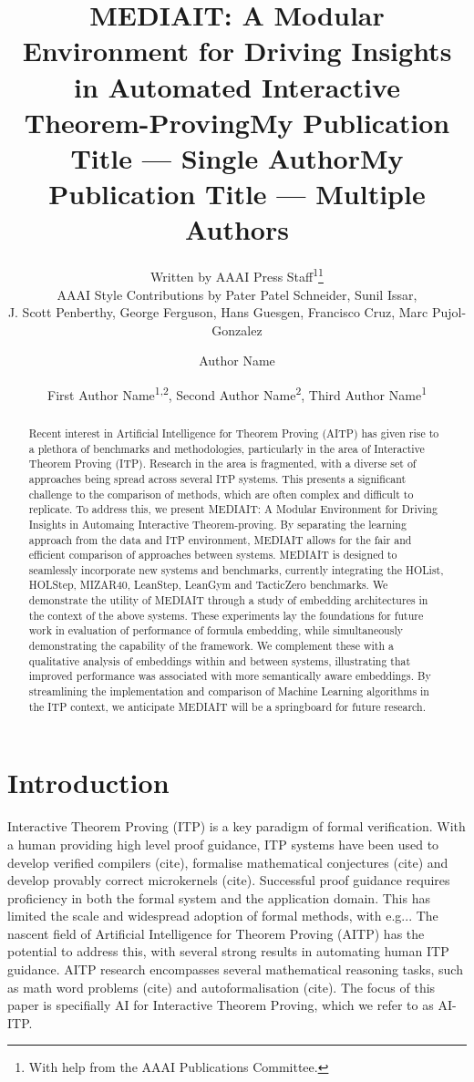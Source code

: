 \documentclass[letterpaper]{article} %
\title{MEDIAIT: A Modular Environment for Driving Insights in Automated Interactive Theorem-Proving}
\author{
    Written by AAAI Press Staff\textsuperscript{\rm 1}\thanks{With help from the AAAI Publications Committee.}\\
    AAAI Style Contributions by Pater Patel Schneider,
    Sunil Issar,\\
    J. Scott Penberthy,
    George Ferguson,
    Hans Guesgen,
    Francisco Cruz\equalcontrib,
    Marc Pujol-Gonzalez\equalcontrib
}
\title{My Publication Title --- Single Author}
\author {
    Author Name
}
\title{My Publication Title --- Multiple Authors}
\author {
    First Author Name\textsuperscript{\rm 1,\rm 2},
    Second Author Name\textsuperscript{\rm 2},
    Third Author Name\textsuperscript{\rm 1}
}
\begin{document}
\maketitle

\begin{abstract}
    Recent interest in Artificial Intelligence for Theorem Proving (AITP) has given rise to a plethora of benchmarks and
    methodologies,
    particularly in the area of Interactive Theorem Proving (ITP).
    Research in the area is fragmented, with a diverse set of approaches being spread across several ITP systems.
    This presents a significant challenge to the comparison of methods, which are often complex and difficult to replicate.
    To address this, we present MEDIAIT: A Modular Environment for Driving Insights in Automaing Interactive Theorem-proving.
    By separating the learning approach from the data and ITP environment, MEDIAIT allows for the fair and efficient
    comparison of approaches between systems.
    MEDIAIT is designed to seamlessly incorporate new systems and benchmarks, currently integrating the HOList, HOLStep,
    MIZAR40, LeanStep, LeanGym and TacticZero benchmarks.
    We demonstrate the utility of MEDIAIT through a study of embedding architectures in the context of the above systems.
    These experiments lay the foundations for future work in evaluation of performance of formula embedding,
    while simultaneously demonstrating the capability of the framework.
    We complement these with a qualitative analysis of embeddings within and between systems, illustrating that improved
    performance was associated with more semantically aware embeddings.
    By streamlining the implementation and comparison of Machine Learning algorithms in the ITP context,
    we anticipate MEDIAIT will be a springboard for future
    research.

\end{abstract}

\section{Introduction}

Interactive Theorem Proving (ITP) is a key paradigm of formal verification.
With a human providing high level proof guidance, ITP systems have been used to develop verified compilers (cite), formalise mathematical conjectures (cite) and develop provably correct microkernels (cite).
Successful proof guidance requires proficiency in both the formal system and the application domain.
This has limited the scale and widespread adoption of formal methods, with e.g...
The nascent field of Artificial Intelligence for Theorem Proving (AITP) has the potential to address this,
with several strong results in automating human ITP guidance.
AITP research encompasses several mathematical reasoning tasks, such as math word problems (cite) and autoformalisation (cite).
The focus of this paper is specifially AI for Interactive Theorem Proving, which we refer to as AI-ITP.
\end{document}
